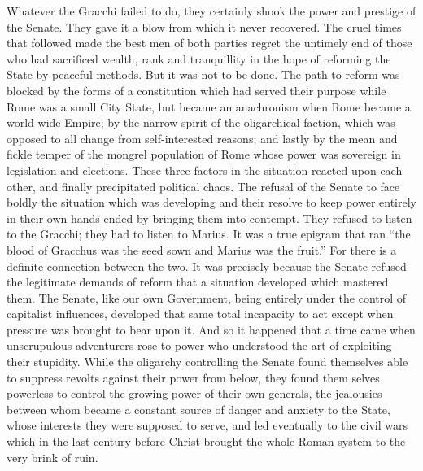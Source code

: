\documentclass{book}
\begin{document}
Whatever the Gracchi failed to do, they certainly shook the power and prestige of the Senate. They gave it a blow from which it never recovered. The cruel times that followed made the best men of both parties regret the untimely end of those who had sacrificed wealth, rank and tranquillity in the hope of reforming the State by peaceful methods. But it was not to be done. The path to reform was blocked by the forms of a constitution which had served their purpose while Rome was a small City State, but became an anachronism when Rome became a world-wide Empire; by the narrow spirit of the oligarchical faction, which was opposed to all change from self-interested reasons; and lastly by the mean and fickle temper of the mongrel population of Rome whose power was sovereign in legislation and elections. These three factors in the situation reacted upon each other, and finally precipitated political chaos. The refusal of the Senate to face boldly the situation which was developing and their resolve to keep power entirely in their own hands ended by bringing them into contempt. They refused to listen to the Gracchi; they had to listen to Marius. It was a true epigram that ran “the blood of Gracchus was the seed sown and Marius was the fruit.” For there is a definite connection between the two. It was precisely because the Senate refused the legitimate demands of reform that a situation developed which mastered them. The Senate, like our own Government, being entirely under the control of capitalist influences, developed that same total incapacity to act except when pressure was brought to bear upon it. And so it happened that a time came when unscrupulous adventurers rose to power who understood the art of exploiting their stupidity. While the oligarchy controlling the Senate found themselves able to suppress revolts against their power from below, they found them selves powerless to control the growing power of their own generals, the jealousies between whom became a constant source of danger and anxiety to the State, whose interests they were supposed to serve, and led eventually to the civil wars which in the last century before Christ brought the whole Roman system to the very brink of ruin.
\end{document}
